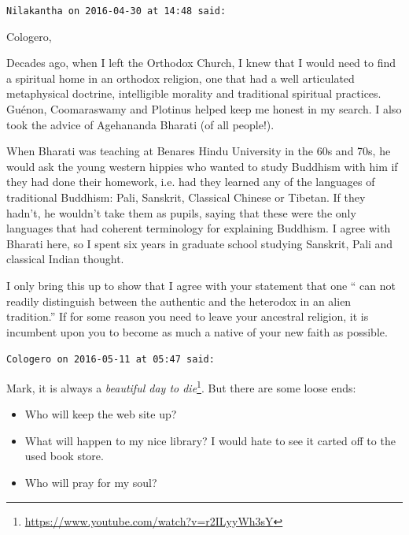 \begin{footnotesize}
\begin{sffamily}
\hfill

\texttt{Nilakantha on 2016-04-30 at 14:48 said:}

Cologero,

Decades ago, when I left the Orthodox Church, I knew that I would need to find a spiritual home in an orthodox religion, one that had a well articulated metaphysical doctrine, intelligible morality and traditional spiritual practices. Guénon, Coomaraswamy and Plotinus helped keep me honest in my search. I also took the advice of Agehananda Bharati (of all people!).

When Bharati was teaching at Benares Hindu University in the 60s and 70s, he would ask the young western hippies who wanted to study Buddhism with him if they had done their homework, i.e. had they learned any of the languages of traditional Buddhism: Pali, Sanskrit, Classical Chinese or Tibetan. If they hadn't, he wouldn't take them as pupils, saying that these were the only languages that had coherent terminology for explaining Buddhism. I agree with Bharati here, so I spent six years in graduate school studying Sanskrit, Pali and classical Indian thought.

I only bring this up to show that I agree with your statement that one `` can not readily distinguish between the authentic and the heterodox in an alien tradition.'' If for some reason you need to leave your ancestral religion, it is incumbent upon you to become as much a native of your new faith as possible.

\hfill

\texttt{Cologero on 2016-05-11 at 05:47 said:}

Mark, it is always a \textit{beautiful day to die}\footnote{\url{https://www.youtube.com/watch?v=r2ILyyWh3sY}}. But there are some loose ends:

\begin{itemize}

\item Who will keep the web site up?

\item What will happen to my nice library? I would hate to see it carted off to the used book store.

\item Who will pray for my soul?
\end{itemize}


\end{sffamily}
\end{footnotesize}

